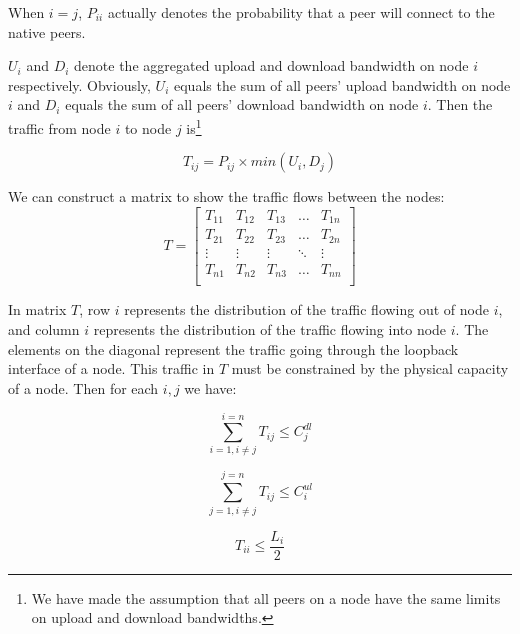 \documentclass[10pt,letterpaper,twocolumn]{article}
\begin{document}
When $i=j$, $P_{ii}$ actually denotes the probability that a peer will
connect to the native peers. 






$U_i$ and $D_i$ denote the aggregated upload and download bandwidth on
node $i$ respectively. Obviously, $U_i$ equals the sum of all peers'
upload bandwidth on node $i$ and $D_i$ equals the sum of all peers'
download bandwidth on node $i$. Then the traffic from node $i$ to node
$j$ is\footnote{We have made the assumption that all peers on a node
  have the same limits on upload and download bandwidths.}

\begin{equation}
T_{ij} = P_{ij} \times min(U_i, D_j)
\end{equation}

We can construct a matrix to show the traffic flows between the nodes:
\begin{equation}
T = 
\begin{bmatrix}
T_{11} & T_{12} & T_{13} &\ldots &  T_{1n} \\
T_{21} & T_{22} & T_{23} & \ldots  & T_{2n} \\
\vdots & \vdots & \vdots & \ddots & \vdots \\
T_{n1} & T_{n2} & T_{n3} & \ldots  & T_{nn} \\
\end{bmatrix}
\end{equation}

In matrix $T$, row $i$ represents the distribution of the traffic
flowing out of node $i$, and column $i$ represents the distribution of
the traffic flowing into node $i$. The elements on the diagonal
represent the traffic going through the loopback interface of a
node. This traffic in $T$ must be constrained by the physical capacity
of a node. Then for each $i, j$ we have:

\begin{equation}
\sum_{i=1, i \neq j}^{i=n} T_{ij} \leqslant  C_{j}^{dl} \label{eq_ucap1}
\end{equation}

\begin{equation}
\sum_{j=1, i \neq j}^{j=n} T_{ij} \leqslant  C_{i}^{ul} \label{eq_ucap2}
\end{equation}

\begin{equation}
T_{ii} \leqslant  \frac{L_{i}}{2} \label{eq_ucap3}
\end{equation}
\end{document}
